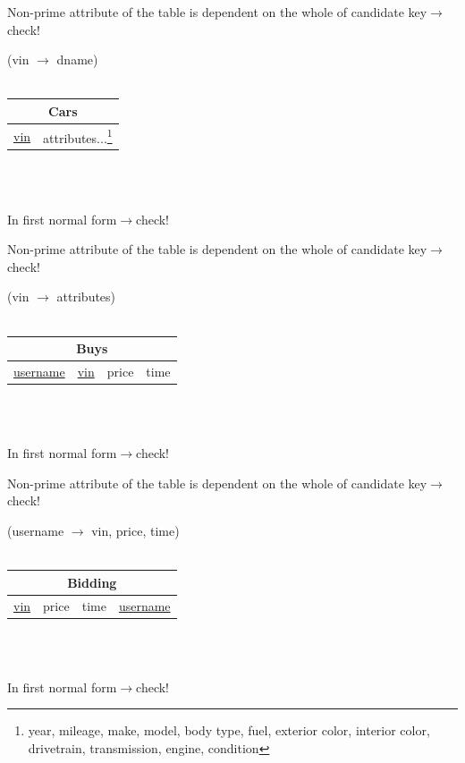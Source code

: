 \documentclass[12pt]{article}
\begin{document}
\par Non-prime attribute of the table is dependent on the whole of candidate key\hfill$\rightarrow$check!
\par (vin $\rightarrow$ dname)\\
~\\
\begin{tabularx}{\textwidth}{|X|X|}
\hline
\multicolumn{2}{|c|}{Cars}\\\hline
\underline{vin} & attributes...\footnote{year, mileage, make, model, body type, fuel, exterior color, interior color, drivetrain, transmission, engine, condition}\\\hline
\end{tabularx}
~\\~\\
\par In first normal form\hfill$\rightarrow$check!
\par Non-prime attribute of the table is dependent on the whole of candidate key\hfill$\rightarrow$check!
\par (vin $\rightarrow$ attributes)\\
~\\
\begin{tabularx}{\textwidth}{|X|X|X|X|}
\hline
\multicolumn{4}{|c|}{Buys}\\\hline
\underline{username} & \underline{vin} & \cellcolor{green!25}price & \cellcolor{green!25}time\\\hline
\end{tabularx}
~\\~\\
\par In first normal form\hfill$\rightarrow$check!
\par Non-prime attribute of the table is dependent on the whole of candidate key\hfill$\rightarrow$check!
\par (username $\rightarrow$ vin, price, time)\\
~\\
\begin{tabularx}{\textwidth}{|X|X|X|X|}
\hline
\multicolumn{4}{|c|}{\cellcolor{green!25}Bidding}\\\hline
\cellcolor{green!25}\underline{vin} & \cellcolor{green!25}price & \cellcolor{green!25}time & \cellcolor{green!25}\underline{username}\\\hline
\end{tabularx}
~\\~\\
\par In first normal form\hfill$\rightarrow$check!
\end{document}

